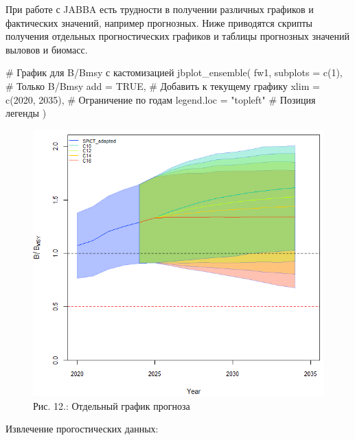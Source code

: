 \documentclass[
  letterpaper,
  DIV=11,
  numbers=noendperiod]{scrreprt}
\newenvironment{Shaded}{\begin{snugshade}}{\end{snugshade}}
\newcommand{\AttributeTok}[1]{\textcolor[rgb]{0.40,0.45,0.13}{#1}}
\newcommand{\CommentTok}[1]{\textcolor[rgb]{0.37,0.37,0.37}{#1}}
\newcommand{\ConstantTok}[1]{\textcolor[rgb]{0.56,0.35,0.01}{#1}}
\newcommand{\DecValTok}[1]{\textcolor[rgb]{0.68,0.00,0.00}{#1}}
\newcommand{\FunctionTok}[1]{\textcolor[rgb]{0.28,0.35,0.67}{#1}}
\newcommand{\NormalTok}[1]{\textcolor[rgb]{0.00,0.23,0.31}{#1}}
\newcommand{\StringTok}[1]{\textcolor[rgb]{0.13,0.47,0.30}{#1}}
\begin{document}
При работе с JABBA есть трудности в получении различных графиков и
фактических значений, например прогнозных. Ниже приводятся скрипты
получения отдельных прогностических графиков и таблицы прогнозных
значений выловов и биомасс.

\begin{Shaded}
\begin{Highlighting}[]
\CommentTok{\# График для B/Bmsy с кастомизацией}
\FunctionTok{jbplot\_ensemble}\NormalTok{(}
\NormalTok{  fw1,}
  \AttributeTok{subplots =} \FunctionTok{c}\NormalTok{(}\DecValTok{1}\NormalTok{),        }\CommentTok{\# Только B/Bmsy}
  \AttributeTok{add =} \ConstantTok{TRUE}\NormalTok{,             }\CommentTok{\# Добавить к текущему графику}
  \AttributeTok{xlim =} \FunctionTok{c}\NormalTok{(}\DecValTok{2020}\NormalTok{, }\DecValTok{2035}\NormalTok{),   }\CommentTok{\# Ограничение по годам}
  \AttributeTok{legend.loc =} \StringTok{"topleft"}  \CommentTok{\# Позиция легенды}
\NormalTok{)}
\end{Highlighting}
\end{Shaded}

\begin{figure}[H]

{\centering \includegraphics[width=0.8\linewidth,height=\textheight,keepaspectratio]{images/JABBA12.PNG}

}

\caption{Рис. 12.: Отдельный график прогноза}

\end{figure}%

Извлечение прогостических данных:
\end{document}
